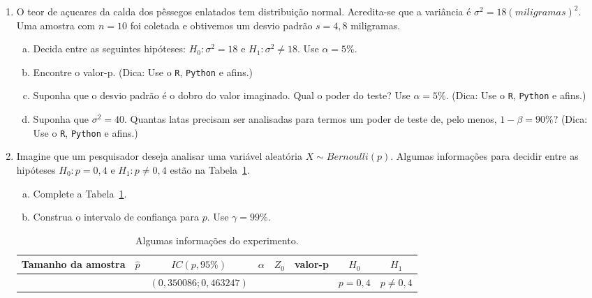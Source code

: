 \documentclass[12pt, a4paper]{article}
\begin{document}
\begin{enumerate}
	\item O teor de açucares da calda dos pêssegos enlatados tem distribuição normal. Acredita-se que a variância é $\sigma^2 = 18 (miligramas)^2$. Uma amostra com $n=10$ foi coletada e obtivemos um desvio padrão $s = 4,8$ miligramas.
	\begin{enumerate}[(a)]
		\item Decida entre as seguintes hipóteses: $H_0: \sigma^2  = 18$ e $H_1: \sigma^2 \neq 18$. Use $\alpha = 5\%$.
		\item Encontre o valor-p. (Dica: Use o \texttt{R}, \texttt{Python} e afins.)
		\item Suponha que o desvio padrão é o dobro do valor imaginado. Qual o poder do teste? Use $\alpha=5\%$. (Dica: Use o \texttt{R}, \texttt{Python} e afins.)
		\item Suponha que $\sigma^2=40$. Quantas latas precisam ser analisadas para termos um poder de teste de, pelo menos, $1-\beta  = 90\%$? (Dica: Use o \texttt{R}, \texttt{Python} e afins.)
	\end{enumerate} 

	\item Imagine que um pesquisador deseja analisar uma variável aleatória $X \sim Bernoulli(p)$. Algumas informações para decidir entre as hipóteses $H_0: p = 0,4$ e $H_1: p \neq 0,4$ estão na Tabela~\ref{tab:bilateral-tab-prop}.
	\begin{enumerate}[(a)]
		\item Complete a Tabela~\ref{tab:bilateral-tab-prop}.
		\item Construa o intervalo de confiança para $p$. Use $\gamma=99\%$.
	\end{enumerate}
	\begin{table}[htbp]
		\centering
		\begin{tabular}{c|c|c|c|c|c|c|c}
			\toprule[0.05cm]
			Tamanho da amostra & $\hat{p}$ & $IC(p, 95\%)$ & $\alpha$ & $Z_0$ & valor-p & $H_0$ & $H_1$\\ \midrule[0.05cm]
			& & $(0,350086; 0,463247)$ & & & & $p=0,4$ & $p \neq 0,4$ \\ \bottomrule[0.05cm]
		\end{tabular}
		\caption{Algumas informações do experimento.}
		\label{tab:bilateral-tab-prop}
	\end{table}


\end{enumerate}
\end{document}
